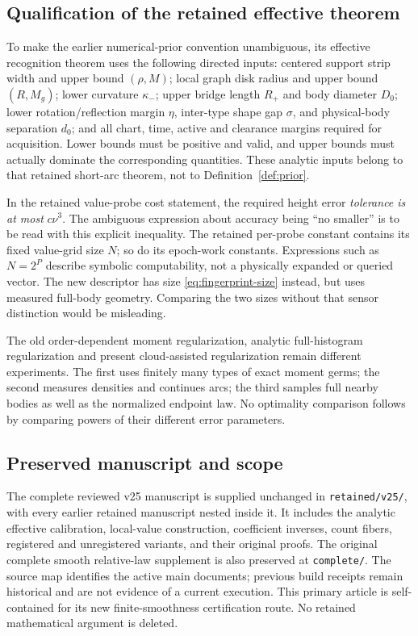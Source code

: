 \subsection{Qualification of the retained effective theorem}
To make the earlier numerical-prior convention unambiguous, its effective
recognition theorem uses the following directed inputs: centered support
strip width and upper bound $(\rho,M)$; local graph disk radius and upper
bound $(R,M_g)$; lower curvature $\kappa_-$; upper bridge length $R_+$
and body diameter $D_0$; lower rotation/reflection margin $\eta$, inter-type
shape gap $\sigma$, and physical-body separation $d_0$; and all chart,
time, active and clearance margins required for acquisition. Lower bounds
must be positive and valid, and upper bounds must actually dominate the
corresponding quantities. These analytic inputs belong to that retained
short-arc theorem, not to Definition~\ref{def:prior}.

In the retained value-probe cost statement, the required height error
\emph{tolerance is at most} $c\nu^3$. The ambiguous expression about
accuracy being ``no smaller'' is to be read with this explicit inequality.
The retained per-probe constant contains its fixed value-grid size $N$;
so do its epoch-work constants. Expressions such as $N=2^P$ describe
symbolic computability, not a physically expanded or queried vector.
The new descriptor has size \eqref{eq:fingerprint-size} instead, but
uses measured full-body geometry. Comparing the two sizes without that
sensor distinction would be misleading.

The old order-dependent moment regularization, analytic full-histogram
regularization and present cloud-assisted regularization remain different
experiments. The first uses finitely many types of exact moment germs;
the second measures densities and continues arcs; the third samples full
nearby bodies as well as the normalized endpoint law. No optimality
comparison follows by comparing powers of their different error parameters.

\subsection{Preserved manuscript and scope}
The complete reviewed v25 manuscript is supplied unchanged in
\texttt{retained/v25/}, with every earlier retained manuscript nested
inside it. It includes the analytic effective calibration, local-value
construction, coefficient inverses, count fibers, registered and
unregistered variants, and their original proofs. The original complete
smooth relative-law supplement is also preserved at \texttt{complete/}.
The source map identifies the active main documents; previous build
receipts remain historical and are not evidence of a current execution.
This primary article is self-contained for its new finite-smoothness
certification route. No retained mathematical argument is deleted.

